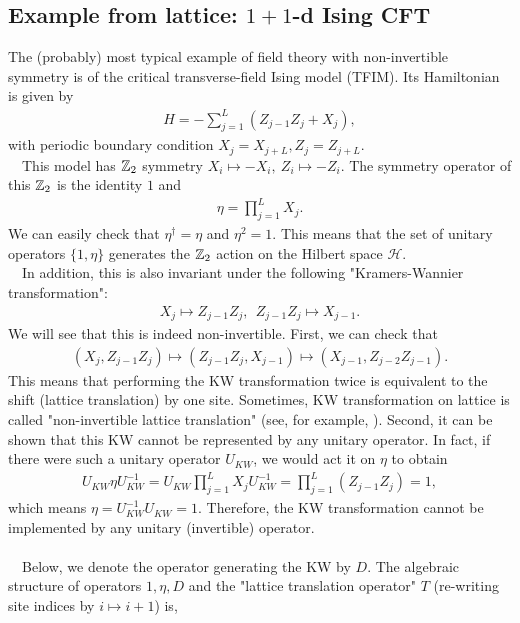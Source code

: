 \documentclass{ltjsarticle}
\theoremstyle{mystyle} %
\numberwithin{equation}{section}
\begin{document}
\subsection{Example from lattice: $1+1$-d Ising CFT}
The (probably) most typical example of field theory with non-invertible symmetry is 
of the critical transverse-field Ising model (TFIM). Its Hamiltonian is given by
\begin{align}
    H = -\sum_{j=1}^{L}(Z_{j-1}Z_j + X_j), 
\end{align}
with periodic boundary condition $X_j = X_{j+L}, Z_j=Z_{j+L}$. \\
　This model has $\mathbb{Z}_2$ symmetry $X_i\mapsto -X_i, ~Z_i\mapsto -Z_i$. 
The symmetry operator of this $\mathbb{Z}_2$ is the identity $1$ and
\begin{align}
    \eta = \prod_{j=1}^{L}X_j.  
\end{align}
We can easily check that $\eta^\dagger=\eta$ and $\eta^2=1$. 
This means that the set of unitary operators $\{1, \eta\}$ generates the $\mathbb{Z}_2$ action on the Hilbert space $\mathcal{H}$. \\
　In addition, this is also invariant under the following "Kramers-Wannier transformation": 
\begin{align}
\label{KW}
X_j\mapsto Z_{j-1}Z_j, ~~ Z_{j-1}Z_j \mapsto X_{j-1}. 
\end{align}
We will see that this is indeed non-invertible. First, we can check that
\begin{align}
    (X_j, Z_{j-1}Z_j)\mapsto (Z_{j-1}Z_j, X_{j-1})\mapsto (X_{j-1}, Z_{j-2}Z_{j-1}). 
\end{align}
This means that performing the KW transformation twice is equivalent to the shift (lattice translation) by one site. 
Sometimes, KW transformation on lattice is called "non-invertible lattice translation" (see, for example, \cite{NSSSSHS}). 
Second, it can be shown that this KW cannot be represented by any unitary operator. 
In fact, if there were such a unitary operator $U_{KW}$, 
we would act it on $\eta$ to obtain
\begin{align}
    U_{KW}\eta U^{-1}_{KW} = U_{KW} \prod_{j=1}^{L} X_j U^{-1}_{KW}
    =\prod_{j=1}^{L}(Z_{j-1}Z_j) = 1, 
\end{align}
which means $\eta = U^{-1}_{KW}U_{KW}=1$. 
Therefore, the KW transformation cannot be implemented by any unitary (invertible) operator. \\
\\
　Below, we denote the operator generating the KW by $D$. 
The algebraic structure of operators $1, \eta, D$ and the "lattice translation operator" $T$ (re-writing site indices by $i\mapsto i+1$) is, 
\end{document}
